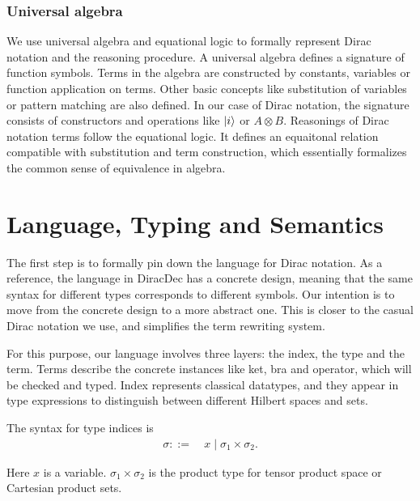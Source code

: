 \documentclass[runningheads]{llncs}
\begin{document}
\subsubsection{Universal algebra}
We use universal algebra and equational logic to formally represent Dirac notation and the reasoning procedure.
A universal algebra defines a signature of function symbols.
Terms in the algebra are constructed by constants, variables or function application on terms. 
Other basic concepts like substitution of variables or pattern matching are also defined.
In our case of Dirac notation, the signature consists of constructors and operations like $\ket{i}$ or $A \otimes B$.
Reasonings of Dirac notation terms follow the equational logic. It defines an equaitonal relation compatible with substitution and term construction, which essentially formalizes the common sense of equivalence in algebra.



\section{Language, Typing and Semantics}
The first step is to formally pin down the language for Dirac notation.
As a reference, the language in DiracDec has a concrete design, meaning that the same syntax for different types corresponds to different symbols.
Our intention is to move from the concrete design to a more abstract one. This is closer to the casual Dirac notation we use, and simplifies the term rewriting system.

For this purpose, our language involves three layers: the index, the type and the term.
Terms describe the concrete instances like ket, bra and operator, which will be checked and typed.
Index represents classical datatypes, and they appear in type expressions to distinguish between different Hilbert spaces and sets.
\begin{definition}
    The syntax for type indices is
    \begin{align*}
        \sigma ::=\ & x \mid \sigma_1 \times \sigma_2.
    \end{align*}
\end{definition}
Here $x$ is a variable. $\sigma_1 \times \sigma_2$ is the product type for tensor product space or Cartesian product sets.
\end{document}
